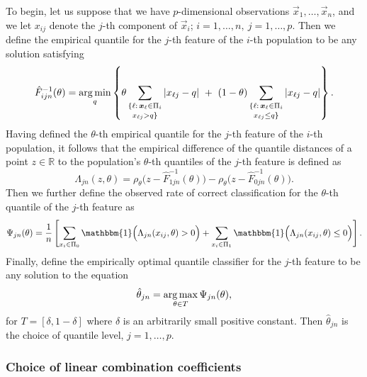 To begin, let us suppose that we have $p$-dimensional observations
$\vec{x}_1, \dots, \vec{x}_n$, and we let $x_{ij}$ denote the $j$-th component
of $\vec{x}_i$; $i = 1, \dots, n,~ j = 1, \dots, p$.  Then we define the
empirical quantile for the $j$-th feature of the $i$-th population to be any
solution satisfying
\begin{equation}
  \label{eq:multivariate-empirical-quantile}
  \hat{F}_{ijn}^{-1} (\theta) = \operatorname*{arg\,min}_q \left\{
    \theta \sum_{\substack{ \{ \ell:\, \bm{x}_{\ell} \in \Pi_i  \\[0.5mm] x_{\ell j} > q \} }}
    |x_{\ell j} - q| ~+~
    (1 - \theta)
    \sum_{\substack{ \{ \ell:\, \bm{x}_{\ell} \in \Pi_i  \\[0.5mm] x_{\ell j} \leq q \} }}
    |x_{\ell j} - q|
  \right\}.
\end{equation}
Having defined the $\theta$-th empirical quantile for the $j$-th feature of the
$i$-th population, it follows that the empirical difference of the quantile
distances of a point $z \in \mathbb{R}$ to the population's $\theta$-th
quantiles of the $j$-th feature is defined as
\[
  \Lambda_{jn} (z, \theta) =
  \rho_{\theta}\Big(z - \hat{F}_{1jn}^{-1}(\theta)\Big) -
  \rho_{\theta}\Big(z - \hat{F}_{0jn}^{-1}(\theta)\Big).
\]
Then we further define the observed rate of correct classification for the
$\theta$-th quantile of the $j$-th feature as
\begin{equation}
  \Psi_{jn}(\theta) = \frac{1}{n}
  \left[
    \sum_{x_i \in \Pi_0}
    \mathbbm{1}\Big( \Lambda_{jn}(x_{ij}, \theta) > 0 \Big) +
    \sum_{x_i \in \Pi_1}
    \mathbbm{1}\Big( \Lambda_{jn}(x_{ij}, \theta) \leq 0 \Big)
  \right].
\end{equation}
Finally, define the empirically optimal quantile classifier for the $j$-th
feature to be any solution to the equation
\begin{equation}
  \hat{\theta}_{jn} = \operatorname*{arg\,max}_{\theta \in T} \Psi_{jn}(\theta),
\end{equation}
for $T = [ \delta, 1 - \delta]$ where $\delta$ is an arbitrarily small positive
constant.  Then $\hat{\theta}_{jn}$ is the choice of quantile level,
$j = 1, \dots, p$.




\subsubsection{Choice of linear combination coefficients}
\label{sec:variable-coefficients}

